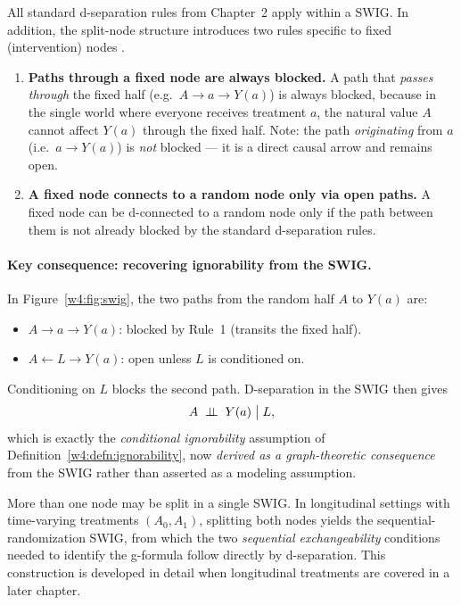 \documentclass[master.tex]{subfiles}
\begin{document}
All standard d-separation rules from Chapter~2 apply within a SWIG.
In addition, the split-node structure introduces two rules specific to
fixed (intervention) nodes \citep{richardson2014ace,bezuidenhout2025swigs}.

\begin{tcolorbox}[defstyle, title={SWIG-Specific D-Separation Rules}]
\begin{enumerate}
  \item \textbf{Paths through a fixed node are always blocked.}
        A path that \emph{passes through} the fixed half (e.g.\
        $A \to a \to Y(a)$) is always blocked, because in the single
        world where everyone receives treatment $a$, the natural value
        $A$ cannot affect $Y(a)$ through the fixed half.  Note: the
        path \emph{originating} from $a$ (i.e.\ $a \to Y(a)$) is
        \emph{not} blocked --- it is a direct causal arrow and remains
        open.
  \item \textbf{A fixed node connects to a random node only via open
        paths.}  A fixed node can be d-connected to a random node only
        if the path between them is not already blocked by the standard
        d-separation rules.
\end{enumerate}
\end{tcolorbox}

\paragraph{Key consequence: recovering ignorability from the SWIG.}
In Figure~\ref{w4:fig:swig}, the two paths from the random half $A$ to
$Y(a)$ are:
\begin{itemize}
  \item $A \to a \to Y(a)$: blocked by Rule~1 (transits the fixed half).
  \item $A \leftarrow L \to Y(a)$: open unless $L$ is conditioned on.
\end{itemize}
Conditioning on $L$ blocks the second path.  D-separation in the SWIG
then gives
\[
  A \;\perp\!\!\!\perp\; Y(a) \;\big|\; L,
\]
which is exactly the \emph{conditional ignorability} assumption of
Definition~\ref{w4:defn:ignorability}, now \emph{derived as a
graph-theoretic consequence} from the SWIG rather than asserted as a
modeling assumption.

\begin{remark}
More than one node may be split in a single SWIG.  In longitudinal
settings with time-varying treatments $(A_0, A_1)$, splitting both nodes
yields the sequential-randomization SWIG, from which the two
\emph{sequential exchangeability} conditions needed to identify the
g-formula follow directly by d-separation.  This construction is
developed in detail when longitudinal treatments are covered in a later chapter.
\end{remark}
\end{document}
